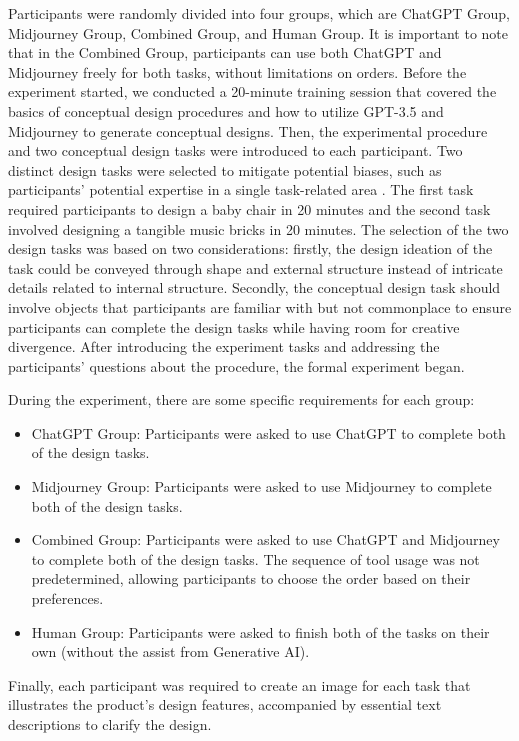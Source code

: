 \documentclass{dsj}
\begin{document}
Participants were randomly divided into four groups, which are ChatGPT Group, Midjourney Group, Combined Group, and Human Group. It is important to note that in the Combined Group, participants can use both ChatGPT and Midjourney freely for both tasks, without limitations on orders. Before the experiment started, we conducted a 20-minute training session that covered the basics of conceptual design procedures and how to utilize GPT-3.5 and Midjourney to generate conceptual designs. Then, the experimental procedure and two conceptual design tasks were introduced to each participant. Two distinct design tasks were selected to mitigate potential biases, such as participants' potential expertise in a single task-related area \citep{hu2018effects}. The first task required participants to design a baby chair in 20 minutes and the second task involved designing a tangible music bricks in 20 minutes. The selection of the two design tasks was based on two considerations: firstly, the design ideation of the task could be conveyed through shape and external structure instead of intricate details related to internal structure. Secondly, the conceptual design task should involve objects that participants are familiar with but not commonplace to ensure participants can complete the design tasks while having room for creative divergence. After introducing the experiment tasks and addressing the participants' questions about the procedure, the formal experiment began.

During the experiment, there are some specific requirements for each group:

\begin{itemize}
  \item ChatGPT Group: Participants were asked to use ChatGPT to complete both of the design tasks.
  \item Midjourney Group: Participants were asked to use Midjourney to complete both of the design tasks.
  \item Combined Group: Participants were asked to use ChatGPT and Midjourney to complete both of the design tasks. The sequence of tool usage was not predetermined, allowing participants to choose the order based on their preferences.
    \item Human Group: Participants were asked to finish both of the tasks on their own (without the assist from Generative AI).
\end{itemize}

Finally, each participant was required to create an image for each task that illustrates the product’s design features, accompanied by essential text descriptions to clarify the design.
\end{document}
